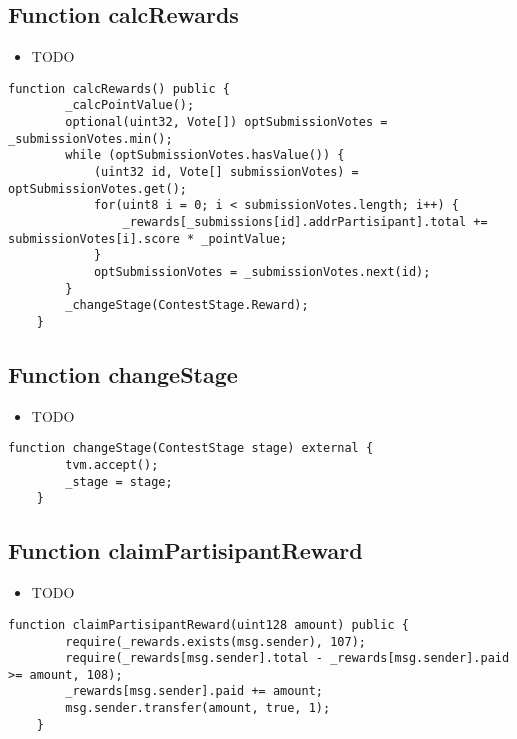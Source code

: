 \subsection{Function calcRewards}

\begin{itemize}
\item TODO
\end{itemize}

\begin{lstlisting}[firstnumber=175]
    function calcRewards() public {
        _calcPointValue();
        optional(uint32, Vote[]) optSubmissionVotes = _submissionVotes.min();
        while (optSubmissionVotes.hasValue()) {
            (uint32 id, Vote[] submissionVotes) = optSubmissionVotes.get();
            for(uint8 i = 0; i < submissionVotes.length; i++) {
                _rewards[_submissions[id].addrPartisipant].total += submissionVotes[i].score * _pointValue;
            }
            optSubmissionVotes = _submissionVotes.next(id);
        }
        _changeStage(ContestStage.Reward);
    }
\end{lstlisting}

\subsection{Function changeStage}

\begin{itemize}
\item TODO
\end{itemize}

\begin{lstlisting}[firstnumber=234]
    function changeStage(ContestStage stage) external {
        tvm.accept();
        _stage = stage;
    }
\end{lstlisting}

\subsection{Function claimPartisipantReward}

\begin{itemize}
\item TODO
\end{itemize}

\begin{lstlisting}[firstnumber=197]
    function claimPartisipantReward(uint128 amount) public {
        require(_rewards.exists(msg.sender), 107);
        require(_rewards[msg.sender].total - _rewards[msg.sender].paid >= amount, 108);
        _rewards[msg.sender].paid += amount;
        msg.sender.transfer(amount, true, 1);
    }
\end{lstlisting}

